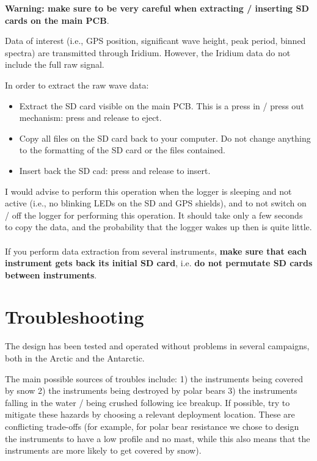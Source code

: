 \documentclass[pdftex,a4paper,12pt,twocolumn,fleqn,captions=tableheading]{scrartcl}
\begin{document}
\textbf{Warning: make sure to be very careful when extracting / inserting SD cards on the main PCB}.

Data of interest (i.e., GPS position, significant wave height, peak period, binned spectra) are transmitted through Iridium. However, the Iridium data do not include the full raw signal.

In order to extract the raw wave data:

\begin{itemize}
  \item Extract the SD card visible on the main PCB. This is a press in / press out mechanism: press and release to eject.
  \item Copy all files on the SD card back to your computer. Do not change anything to the formatting of the SD card or the files contained.
  \item Insert back the SD cad: press and release to insert.
\end{itemize}

I would advise to perform this operation when the logger is sleeping and not active (i.e., no blinking LEDs on the SD and GPS shields), and to not switch on / off the logger for performing this operation. It should take only a few seconds to copy the data, and the probability that the logger wakes up then is quite little. \\~\\

If you perform data extraction from several instruments, \textbf{make sure that each instrument gets back its initial SD card}, i.e. \textbf{do not permutate SD cards between instruments}.


\section{Troubleshooting}

The design has been tested and operated without problems in several campaigns, both in the Arctic and the Antarctic.

The main possible sources of troubles include: 1) the instruments being covered by snow 2) the instruments being destroyed by polar bears 3) the instruments falling in the water / being crushed following ice breakup. If possible, try to mitigate these hazards by choosing a relevant deployment location. These are conflicting trade-offs (for example, for polar bear resistance we chose to design the instruments to have a low profile and no mast, while this also means that the instruments are more likely to get covered by snow).
\end{document}
